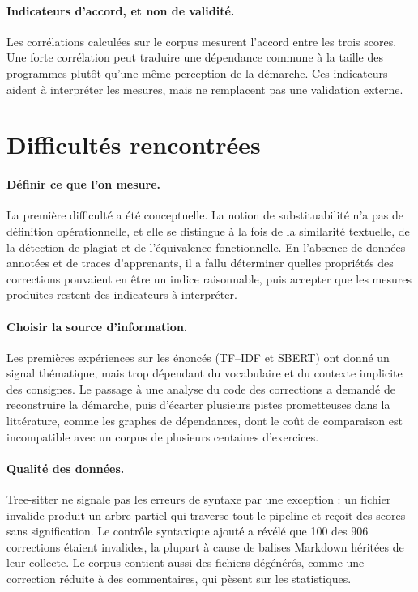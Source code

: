 \documentclass[12pt,a4paper,oneside]{report}
\begin{document}
\paragraph{Indicateurs d'accord, et non de validité.}
Les corrélations calculées sur le corpus mesurent l'accord entre les trois
scores. Une forte corrélation peut traduire une dépendance commune à la
taille des programmes plutôt qu'une même perception de la démarche. Ces
indicateurs aident à interpréter
les mesures, mais ne remplacent pas une validation externe.

\section{Difficultés rencontrées}

\paragraph{Définir ce que l'on mesure.}
La première difficulté a été conceptuelle. La notion de substituabilité
n'a pas de définition opérationnelle, et elle se distingue à la fois de la
similarité textuelle, de la détection de plagiat et de l'équivalence
fonctionnelle. En l'absence de données annotées et de traces
d'apprenants, il a fallu déterminer quelles propriétés des corrections
pouvaient en être un indice raisonnable, puis accepter que les mesures
produites restent des indicateurs à interpréter.

\paragraph{Choisir la source d'information.}
Les premières expériences sur les énoncés (TF--IDF et SBERT) ont donné un
signal thématique, mais trop dépendant du vocabulaire et du contexte
implicite des consignes. Le passage à une analyse du code des corrections
a demandé de reconstruire la démarche, puis d'écarter plusieurs pistes
prometteuses dans la littérature, comme les graphes de dépendances, dont le
coût de comparaison est incompatible avec un corpus de plusieurs centaines
d'exercices.

\paragraph{Qualité des données.}
Tree-sitter ne signale pas les erreurs de syntaxe par une exception : un
fichier invalide produit un arbre partiel qui traverse tout le pipeline et
reçoit des scores sans signification. Le contrôle syntaxique ajouté a
révélé que 100 des 906 corrections étaient invalides, la plupart à cause
de balises Markdown héritées de leur collecte. Le corpus contient aussi des
fichiers dégénérés, comme une correction réduite à des commentaires, qui
pèsent sur les statistiques.
\end{document}
